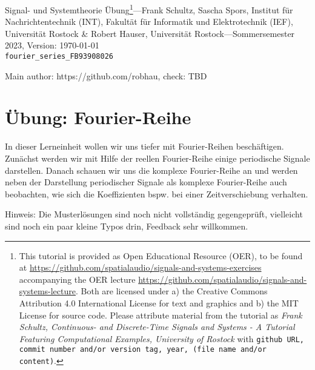 \documentclass[11pt,a4paper,DIV=12]{scrartcl}
\begin{document}
%
\noindent Signal- und Systemtheorie Übung\footnote{This tutorial is provided as
Open Educational Resource (OER), to be found at
\url{https://github.com/spatialaudio/signals-and-systems-exercises}
accompanying the OER lecture
\url{https://github.com/spatialaudio/signals-and-systems-lecture}.
%
Both are licensed under a) the Creative Commons Attribution 4.0 International
License for text and graphics and b) the MIT License for source code.
%
Please attribute material from the tutorial as \textit{Frank Schultz,
Continuous- and Discrete-Time Signals and Systems - A Tutorial Featuring
Computational Examples, University of Rostock} with
\texttt{github URL, commit number and/or version tag, year, (file name and/or
content)}.}---Frank Schultz, Sascha Spors,
Institut für Nachrichtentechnik (INT),
Fakultät für Informatik und Elektrotechnik (IEF),
Universität Rostock \&
Robert Hauser, Universität Rostock---Sommersemester 2023, Version: \today\\
\verb|fourier_series_FB93908026|
%

\noindent Main author: https://github.com/robhau, check: TBD

\tableofcontents

\section{Übung: Fourier-Reihe}
In dieser Lerneinheit wollen wir uns tiefer mit Fourier-Reihen beschäftigen.
Zunächst werden wir mit Hilfe der reellen Fourier-Reihe einige periodische Signale
darstellen.
%
Danach schauen wir uns die komplexe Fourier-Reihe an und werden neben der
Darstellung periodischer Signale als komplexe Fourier-Reihe auch beobachten,
wie sich die Koeffizienten bspw. bei einer Zeitverschiebung verhalten.

Hinweis: Die Musterlösungen sind noch nicht vollständig gegengeprüft, vielleicht
sind noch ein paar kleine Typos drin, Feedback sehr willkommen.
\end{document}
